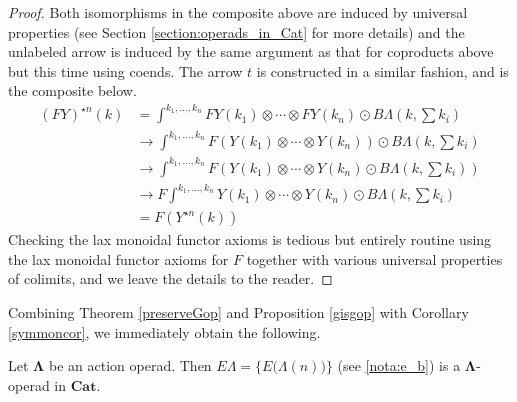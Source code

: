 \documentclass{amsbook} %
\newcommand{\mb}{\mathbf}
\numberwithin{section}{chapter}
\begin{document}
\begin{proof}
Both isomorphisms in the composite above are induced by universal properties (see Section \ref{section:operads_in_Cat} for more details) and the unlabeled arrow is induced by the same argument as that for coproducts above but this time using coends.  The arrow $t$ is constructed in a similar fashion, and is the composite below.
\begin{align*}
(FY)^{\star n}(k) & =  \int^{k_{1}, \ldots, k_{n}} FY(k_{1}) \otimes \cdots \otimes FY(k_{n}) \odot B\Lambda(k, \sum k_{i}) \\
& \rightarrow   \int^{k_{1}, \ldots, k_{n}} F(Y(k_{1}) \otimes \cdots \otimes Y(k_{n})) \odot B\Lambda(k, \sum k_{i}) \\
& \rightarrow  \int^{k_{1}, \ldots, k_{n}} F(Y(k_{1}) \otimes \cdots \otimes Y(k_{n}) \odot B\Lambda(k, \sum k_{i}) ) \\
& \rightarrow  F\int^{k_{1}, \ldots, k_{n}} Y(k_{1}) \otimes \cdots \otimes Y(k_{n}) \odot B\Lambda(k, \sum k_{i})  \\
& =  F(Y^{\star n}(k))
\end{align*}
Checking the lax monoidal functor axioms is tedious but entirely routine using the lax monoidal functor axioms for $F$ together with various universal properties of colimits, and we leave the details to the reader.
\end{proof}



Combining Theorem \ref{preserveGop} and Proposition \ref{gisgop} with Corollary \ref{symmoncor}, we immediately obtain the following.

\begin{cor}\label{cor:elambda_lambdaop}
Let $\mb{\Lambda}$ be an action operad.  Then $E\Lambda = \{ E\big(\Lambda(n)\big) \}$ (see \cref{nota:e_b}) is a $\mb{\Lambda}$-operad in $\mb{Cat}$.
\end{cor}
\end{document}
